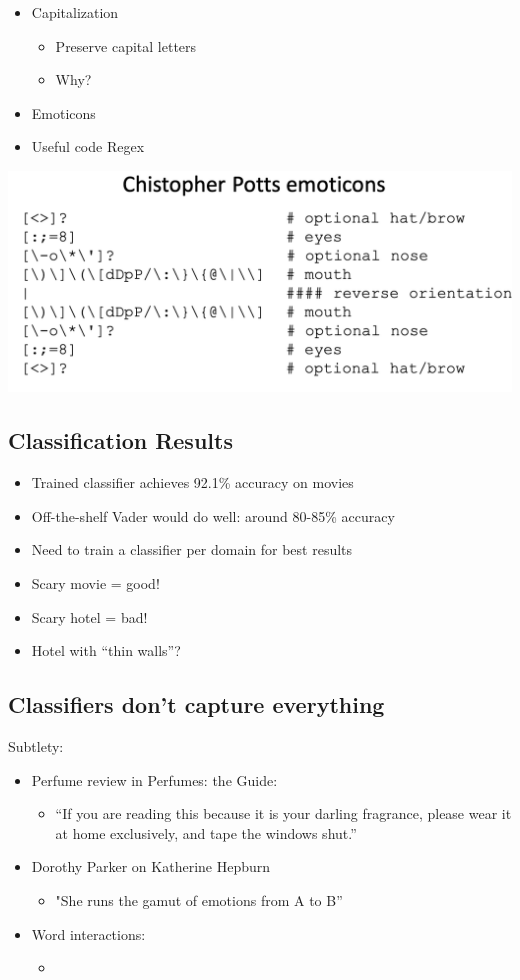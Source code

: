 \documentclass[11pt]{article}
\theoremstyle{definition}
\begin{document}
\begin{itemize}
  \item Capitalization
  \begin{itemize}
    \item Preserve capital letters
    \item Why?
  \end{itemize}
  \item Emoticons
  \item Useful code Regex
\end{itemize}
\includegraphics[width=\textwidth]{13.png}

\subsection{Classification Results}
\begin{itemize}
  \item Trained classifier achieves 92.1\% accuracy on movies
  \item Off-the-shelf Vader would do well: around 80-85\% accuracy
\end{itemize}
\begin{itemize}
  \item Need to train a classifier per domain for best results
  \item Scary movie = good!
  \item Scary hotel = bad!
  \item Hotel with “thin walls”?
\end{itemize}

\subsection{Classifiers don’t capture everything}
Subtlety:

\begin{itemize}
  \item Perfume review in Perfumes: the Guide:
  \begin{itemize}
    \item “If you are reading this because it is your darling fragrance,
    please wear it at home exclusively, and tape the windows
    shut.”
  \end{itemize}
  \item Dorothy Parker on Katherine Hepburn
  \begin{itemize}
    \item "She runs the gamut of emotions from A to B”
  \end{itemize}
\end{itemize}

\begin{itemize}
  \item Word interactions:
  \begin{itemize}
    \item 
  \end{itemize}
\end{itemize}
\end{document}
